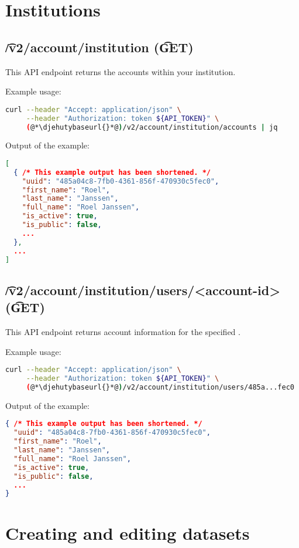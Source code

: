 \section{Institutions}

\subsection{\t{/v2/account/institution} (\t{GET})}

  This API endpoint returns the accounts within your institution.

  Example usage:
\begin{lstlisting}[language=bash]
curl --header "Accept: application/json" \
     --header "Authorization: token ${API_TOKEN}" \
     (@*\djehutybaseurl{}*@)/v2/account/institution/accounts | jq
\end{lstlisting}

  Output of the example:
\begin{lstlisting}[language=JSON]
[
  { /* This example output has been shortened. */
    "uuid": "485a04c8-7fb0-4361-856f-470930c5fec0",
    "first_name": "Roel",
    "last_name": "Janssen",
    "full_name": "Roel Janssen",
    "is_active": true,
    "is_public": false,
    ...
  },
  ...
]
\end{lstlisting}

\subsection{\t{/v2/account/institution/users/<account-id>} (\t{GET})}

  This API endpoint returns account information for the
  specified .

  Example usage:
\begin{lstlisting}[language=bash]
curl --header "Accept: application/json" \
     --header "Authorization: token ${API_TOKEN}" \
     (@*\djehutybaseurl{}*@)/v2/account/institution/users/485a...fec0 | jq
\end{lstlisting}

  Output of the example:
\begin{lstlisting}[language=JSON]
{ /* This example output has been shortened. */
  "uuid": "485a04c8-7fb0-4361-856f-470930c5fec0",
  "first_name": "Roel",
  "last_name": "Janssen",
  "full_name": "Roel Janssen",
  "is_active": true,
  "is_public": false,
  ...
}
\end{lstlisting}

\section{Creating and editing datasets}


